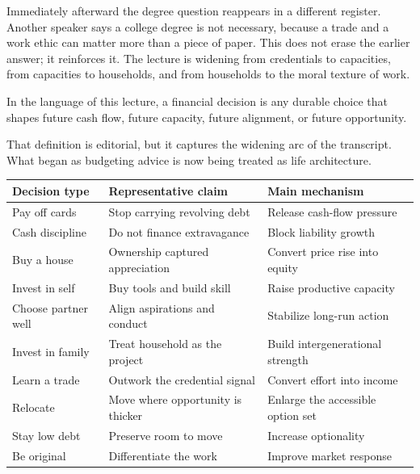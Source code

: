 Immediately afterward the degree question reappears in a different register. Another speaker says a college degree is not necessary, because a trade and a work ethic can matter more than a piece of paper. This does not erase the earlier answer; it reinforces it. The lecture is widening from credentials to capacities, from capacities to households, and from households to the moral texture of work.

\begin{definition}
In the language of this lecture, a financial decision is any durable choice that shapes future cash flow, future capacity, future alignment, or future opportunity.
\end{definition}

That definition is editorial, but it captures the widening arc of the transcript. What began as budgeting advice is now being treated as life architecture.

\begin{table}
\begin{center}
\begin{tabular}{|l|l|l|}
\hline
Decision type & Representative claim & Main mechanism \\
\hline
Pay off cards & Stop carrying revolving debt & Release cash-flow pressure \\
Cash discipline & Do not finance extravagance & Block liability growth \\
Buy a house & Ownership captured appreciation & Convert price rise into equity \\
Invest in self & Buy tools and build skill & Raise productive capacity \\
Choose partner well & Align aspirations and conduct & Stabilize long-run action \\
Invest in family & Treat household as the project & Build intergenerational strength \\
Learn a trade & Outwork the credential signal & Convert effort into income \\
Relocate & Move where opportunity is thicker & Enlarge the accessible option set \\
Stay low debt & Preserve room to move & Increase optionality \\
Be original & Differentiate the work & Improve market response \\
\hline
\end{tabular}
\end{center}
\end{table}

